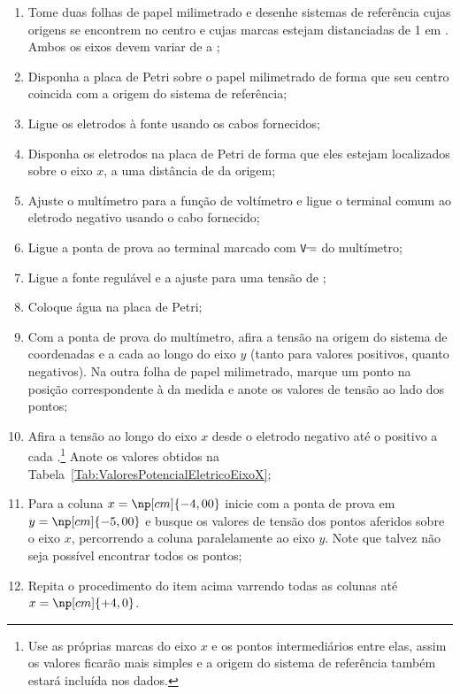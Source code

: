\begin{enumerate}
	\item Tome duas folhas de papel milimetrado e desenhe sistemas de referência cujas origens se encontrem no centro e cujas marcas estejam distanciadas de 1 em . Ambos os eixos devem variar de  a ;
	\item Disponha a placa de Petri sobre o papel milimetrado de forma que seu centro coincida com a origem do sistema de referência;
	\item Ligue os eletrodos à fonte usando os cabos fornecidos;
	\item Disponha os eletrodos na placa de Petri de forma que eles estejam localizados sobre o eixo $x$, a uma distância de  da origem;
	\item Ajuste o multímetro para a função de voltímetro e ligue o terminal comum ao eletrodo negativo usando o cabo fornecido;
	\item Ligue a ponta de prova ao terminal marcado com \texttt{V$\mathdirectcurrent$} do multímetro;
	\item Ligue a fonte regulável e a ajuste para uma tensão de ;
	\item Coloque água na placa de Petri;
	\item Com a ponta de prova do multímetro, afira a tensão na origem do sistema de coordenadas e a cada  ao longo do eixo $y$ (tanto para valores positivos, quanto negativos). Na outra folha de papel milimetrado, marque um ponto na posição correspondente à da medida e anote os valores de tensão ao lado dos pontos;
	\item Afira a tensão ao longo do eixo $x$ desde o eletrodo negativo até o positivo a cada .\footnote{Use as próprias marcas do eixo $x$ e os pontos intermediários entre elas, assim os valores ficarão mais simples e a origem do sistema de referência também estará incluída nos dados.} Anote os valores obtidos na Tabela~\ref{Tab:ValoresPotencialEletricoEixoX};
	\item Para a coluna $x = \np[cm]{-4,00}$ inicie com a ponta de prova em $y = \np[cm]{-5,00}$ e busque os valores de tensão dos pontos aferidos sobre o eixo $x$, percorrendo a coluna paralelamente ao eixo $y$. Note que talvez não seja possível encontrar todos os pontos;
	\item Repita o procedimento do item acima varrendo todas as colunas até $x = \np[cm]{+4,0}$.
\end{enumerate}

